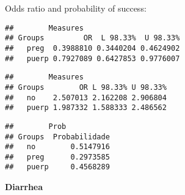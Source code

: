 \documentclass[
]{article}
\newenvironment{Shaded}{\begin{snugshade}}{\end{snugshade}}
\newcommand{\CommentTok}[1]{\textcolor[rgb]{0.56,0.35,0.01}{\textit{#1}}}
\newcommand{\KeywordTok}[1]{\textcolor[rgb]{0.13,0.29,0.53}{\textbf{#1}}}
\newcommand{\NormalTok}[1]{#1}
\newcommand{\OperatorTok}[1]{\textcolor[rgb]{0.81,0.36,0.00}{\textbf{#1}}}
\begin{document}
Odds ratio and probability of success:

\begin{Shaded}
\end{Shaded}

\begin{verbatim}
##        Measures
## Groups         OR  L 98.33%  U 98.33%
##   preg  0.3988810 0.3440204 0.4624902
##   puerp 0.7927089 0.6427853 0.9776007
\end{verbatim}

\begin{Shaded}
\end{Shaded}

\begin{verbatim}
##        Measures
## Groups        OR L 98.33% U 98.33%
##   no    2.507013 2.162208 2.906804
##   puerp 1.987332 1.588333 2.486562
\end{verbatim}

\begin{Shaded}
\end{Shaded}

\begin{verbatim}
##        Prob
## Groups  Probabilidade
##   no        0.5147916
##   preg      0.2973585
##   puerp     0.4568289
\end{verbatim}

\textbf{Diarrhea}
\end{document}
